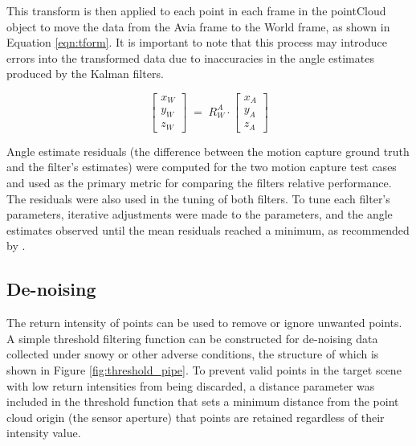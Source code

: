 This transform is then applied to each point in each frame in the pointCloud object to move the data from the Avia frame to the World frame, as shown in Equation \ref{eqn:tform}. It is important to note that this process may introduce errors into the transformed data due to inaccuracies in the angle estimates produced by the Kalman filters.

\begin{equation} \label{eqn:tform}
    \begin{bmatrix}
    x_{W} \\
    y_{W} \\
    z_{W}
    \end{bmatrix}   \;=\; R_W^A \cdot 
    \begin{bmatrix}
    x_{A} \\
    y_{A} \\
    z_{A}
    \end{bmatrix}
\end{equation}

Angle estimate residuals (the difference between the motion capture ground truth and the filter's estimates) were computed for the two motion capture test cases and used as the primary metric for comparing the filters relative performance. The residuals were also used in the tuning of both filters. To tune each filter's parameters, iterative adjustments were made to the parameters, and the angle estimates observed until the mean residuals reached a minimum, as recommended by \textcite{grewalApplicationsKalmanFiltering2010}.
 
\subsection{De-noising}
\label{sec:ch6.section3.subsec2}

The return intensity of points can be used to remove or ignore unwanted points. A simple threshold filtering function can be constructed for de-noising data collected under snowy or other adverse conditions, the structure of which is shown in Figure \ref{fig:threshold_pipe}. To prevent valid points in the target scene with low return intensities from being discarded, a distance parameter was included in the threshold function that sets a minimum distance from the point cloud origin (the sensor aperture) that points are retained regardless of their intensity value.

